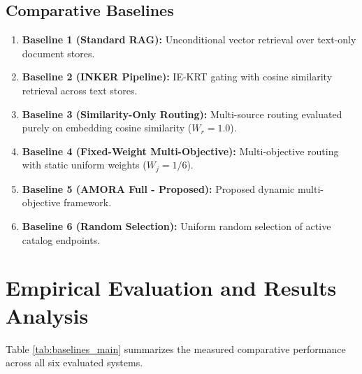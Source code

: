 \documentclass[journal,10pt,twocolumn]{IEEEtran}
\begin{document}
\subsection{Comparative Baselines}
\begin{enumerate}
    \item \textbf{Baseline 1 (Standard RAG):} Unconditional vector retrieval over text-only document stores.
    \item \textbf{Baseline 2 (INKER Pipeline):} IE-KRT gating with cosine similarity retrieval across text stores.
    \item \textbf{Baseline 3 (Similarity-Only Routing):} Multi-source routing evaluated purely on embedding cosine similarity ($W_r = 1.0$).
    \item \textbf{Baseline 4 (Fixed-Weight Multi-Objective):} Multi-objective routing with static uniform weights ($W_j = 1/6$).
    \item \textbf{Baseline 5 (AMORA Full - Proposed):} Proposed dynamic multi-objective framework.
    \item \textbf{Baseline 6 (Random Selection):} Uniform random selection of active catalog endpoints.
\end{enumerate}

\section{Empirical Evaluation and Results Analysis}
\label{sec:results}

Table \ref{tab:baselines_main} summarizes the measured comparative performance across all six evaluated systems.
\end{document}
